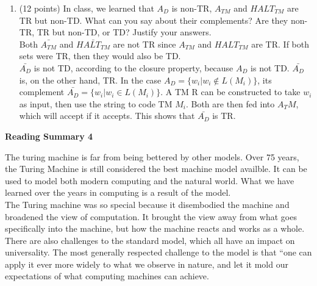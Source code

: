 \documentclass[11pt]{article}
\begin{document}
\begin{enumerate}
  \item (12 points) In class, we learned that $A_D$ is non-TR, $A_{TM}$ and $HALT_{TM}$ are TR but non-TD. What can you say 
	about their complements? Are they non-TR, TR but non-TD, or TD? Justify your answers. \\
	
	Both $\bar{A_{TM}}$ and $\bar{HALT_{TM}}$ are not TR since $A_{TM}$ and $HALT_{TM}$ are TR. If both sets were TR, then
	they would also be TD. \\
	$\bar{A_D}$ is not TD, according to the closure property, because $A_D$ is not TD. $\bar{A_D}$ is, on the other hand, TR.
	In the case $A_D = \{w_i | w_i \notin L(M_i) \}$, its complement $\bar{A_D} = \{w_i | w_i \in L(M_i) \}$. A TM R can be
	constructed to take $w_i$ as input, then use the string to code TM $M_i$. Both are then fed into $A_TM$, which will accept
	if it accepts. This shows that $\bar{A_D}$ is TR.
\end{enumerate}

\pagebreak
\setlength{\parindent}{1cm}
\centerline{\bf Reading Summary 4}

\begin{spacing}{1.5}
 \indent The turing machine is far from being bettered by other models. Over 75 years, the Turing Machine is still considered the best machine
 model availble. It can be used to model both modern computing and the natural world. What we have learned over the years in computing is a
 result of the model. \\
 \indent The Turing machine was so special because it disembodied the machine and broadened the view of computation. It brought the view away
 from what goes specifically into the machine, but how the machine reacts and works as a whole. There are also challenges to the standard model,
 which all have an impact on universality. The most generally respected challenge to the model is that ``one can apply it ever more widely to what
 we observe in nature, and let it mold our expectations of what computing machines can achieve.
\end{spacing}
\end{document}
